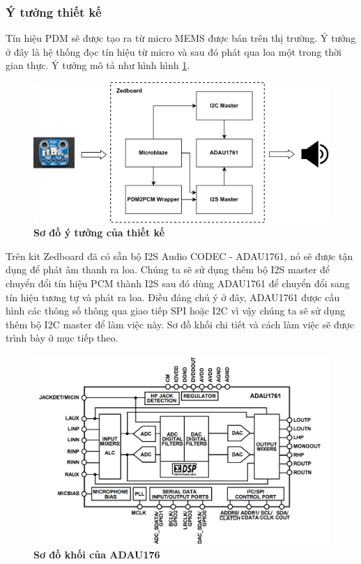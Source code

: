 \subsubsection{Ý tưởng thiết kế}

Tín hiệu PDM sẽ được tạo ra từ micro MEMS được bán trên thị trường. Ý tưởng ở đây là hệ thống đọc tín hiệu từ micro và sau đó phát qua loa một trong thời gian thực.
Ý tưởng mô tả như hình hình \ref{pinouts}.
\begin{figure}[H]
    \centering
    \includegraphics[width=14cm]{Images/Chuong5/fpga/top.png}
    \caption[Sơ đồ ý tưởng của thiết kế]{\bfseries \fontsize{12pt}{0pt}\selectfont Sơ đồ ý tưởng của thiết kế}
    \label{pinouts}
\end{figure}

Trên kit Zedboard đã có sẵn bộ I2S Audio CODEC - ADAU1761, nó sẽ được tận dụng để phát âm thanh ra loa. Chúng ta sẽ sử dụng thêm bộ I2S master để chuyển đổi tín hiệu PCM thành I2S sau đó dùng ADAU1761 để chuyển đổi sang tín hiệu tương tự và phát ra loa. Điều đáng chú ý ở đây, ADAU1761 được cấu hình các thông số thông qua giao tiếp SPI hoặc I2C vì vậy chúng ta sẽ sử dụng thêm bộ I2C master để làm việc này. Sơ đồ khối chi tiết và cách làm việc sẽ được trình bày ở mục tiếp theo.

\begin{figure}[H]
    \centering
    \includegraphics[width=14cm]{Images/Chuong5/fpga/adau.png}
    \caption[Sơ đồ khối của ADAU1761]{\bfseries \fontsize{12pt}{0pt}\selectfont Sơ đồ khối của ADAU176}
    \label{adau}
\end{figure}

